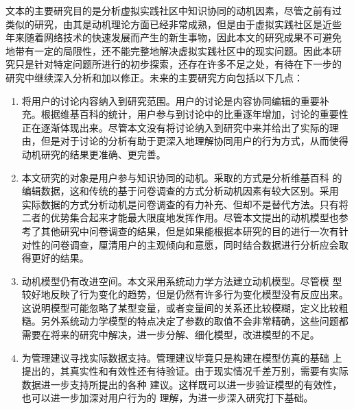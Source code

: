 文本的主要研究目的是分析虚拟实践社区中知识协同的动机因素，尽管之前有过
类似的研究，由其是动机理论方面已经非常成熟，但是由于虚拟实践社区是近些
年来随着网络技术的快速发展而产生的新生事物，因此本文的研究成果不可避免
地带有一定的局限性，还不能完整地解决虚拟实践社区中的现实问题。因此本研
究只是针对特定问题所进行的初步探索，还存在许多不足之处，有待在下一步的
研究中继续深入分析和加以修正。未来的主要研究方向包括以下几点：
\begin{enumerate}
\item 将用户的讨论内容纳入到研究范围。用户的讨论是内容协同编辑的重要补
  充。根据维基百科的统计，用户参与到讨论中的比重逐年增加，讨论的重要性
  正在逐渐体现出来。尽管本文没有将讨论纳入到研究中来并给出了实际的理
  由，但是对于讨论的分析有助于更深入地理解协同用户的行为方式，从而使得
  动机研究的结果更准确、更完善。
\item 本文研究的对象是用户参与知识协同的动机。采取的方式是分析维基百科
  的编辑数据，这和传统的基于问卷调查的方式分析动机因素有较大区别。采用
  实际数据的方式分析动机是问卷调查的有力补充、但却不是替代方法。只有将
  二者的优势集合起来才能最大限度地发挥作用。尽管本文提出的动机模型也参
  考了其他研究中问卷调查的结果，但是如果能根据本研究的目的进行一次有针
  对性的问卷调查，厘清用户的主观倾向和意愿，同时结合数据进行分析应会取
  得更好的结果。
\item 动机模型仍有改进空间。本文采用系统动力学方法建立动机模型。尽管模
  型较好地反映了行为变化的趋势，但是仍然有许多行为变化模型没有反应出来。
  这说明模型可能忽略了某型变量，或者变量间的关系还比较模糊，定义比较粗
  糙。另外系统动力学模型的特点决定了参数的取值不会非常精确，这些问题都
  需要在将来的研究中解决，进一步分解、细化模型，改进模型的不足。
\item 为管理建议寻找实际数据支持。管理建议毕竟只是构建在模型仿真的基础
  上提出的，其真实性和有效性还有待验证。由于现实情况千差万别，需要有实际数据进一步支持所提出的各种
  建议。这样既可以进一步验证模型的有效性，也可以进一步加深对用户行为的
  理解，为进一步深入研究打下基础。
\end{enumerate}




